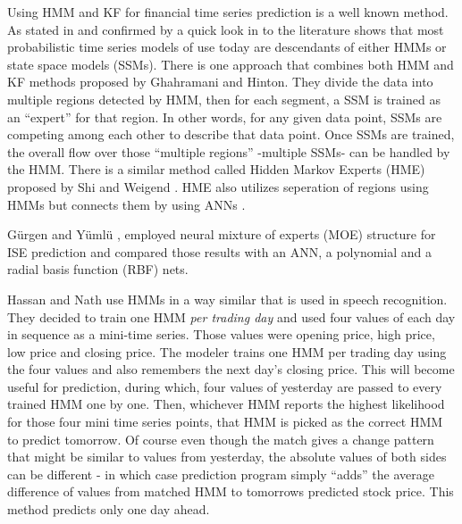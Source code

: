 Using HMM and KF for financial time series prediction is a well known method. As
stated in \cite{ghahramani3} and confirmed by a quick look in to the literature
shows that most probabilistic time series models of use today are descendants of
either HMMs or state space models (SSMs). There is one approach that combines
both HMM and KF methods proposed by Ghahramani and Hinton. They divide the data
into multiple regions detected by HMM, then for each segment, a SSM is trained
as an ``expert'' for that region. In other words, for any given data point, SSMs
are competing among each other to describe that data point. Once SSMs are
trained, the overall flow over those ``multiple regions'' -multiple SSMs- can be
handled by the HMM. There is a similar method called Hidden Markov Experts (HME)
proposed by Shi and Weigend \cite{shi}. HME also utilizes seperation of regions
using HMMs but connects them by using ANNs \cite{nabney}.

Gürgen and Yümlü \cite{gurgen}, employed neural mixture of experts (MOE)
structure for ISE prediction and compared those results with an ANN, a
polynomial and a radial basis function (RBF) nets.

Hassan and Nath \cite{hassan} use HMMs in a way similar that is used in speech
recognition. They decided to train one HMM {\em per trading day} and used four
values of each day in sequence as a mini-time series. Those values were opening
price, high price, low price and closing price. The modeler trains one HMM per
trading day using the four values and also remembers the next day's closing
price. This will become useful for prediction, during which, four values of
yesterday are passed to every trained HMM one by one. Then, whichever HMM
reports the highest likelihood for those four mini time series points, that HMM
is picked as the correct HMM to predict tomorrow. Of course even though the
match gives a change pattern that might be similar to values from yesterday, the
absolute values of both sides can be different - in which case prediction
program simply ``adds'' the average difference of values from matched HMM to
tomorrows predicted stock price. This method \cite{hassan} predicts only one day
ahead.

